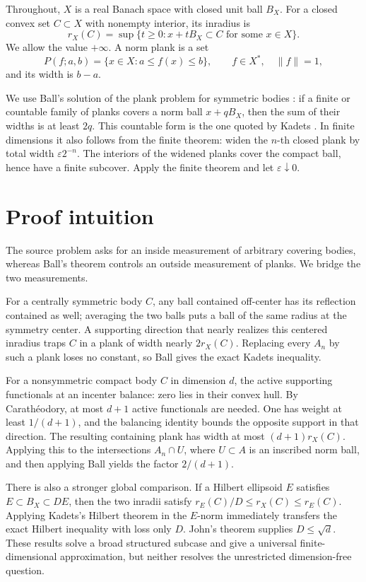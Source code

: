 \documentclass[11pt]{article}
\theoremstyle{remark}
\newcommand{\Ball}{B_X}
\newcommand{\rin}{r_X}
\begin{document}
Throughout, \(X\) is a real Banach space with closed unit ball \(\Ball\). For
a closed convex set \(C\subset X\) with nonempty interior, its inradius is
\[
  \rin(C)=\sup\{t\ge0: x+t\Ball\subset C\text{ for some }x\in X\}.
\]
We allow the value \(+\infty\). A norm plank is a set
\[
  P(f;a,b)=\{x\in X:a\le f(x)\le b\},
  \qquad f\in X^*,\quad \|f\|=1,
\]
and its width is \(b-a\).

We use Ball's solution of the plank problem for symmetric bodies
\cite{Ball}: if a finite or countable family of planks covers a norm ball
\(x+q\Ball\), then the sum of their widths is at least \(2q\). This countable
form is the one quoted by Kadets \cite[p.~1]{Kadets}. In finite dimensions it
also follows from the finite theorem: widen the \(n\)-th closed plank by total
width \(\varepsilon 2^{-n}\). The interiors of the widened planks cover the
compact ball, hence have a finite subcover. Apply the finite theorem and let
\(\varepsilon\downarrow0\).

\section{Proof intuition}

The source problem asks for an inside measurement of arbitrary covering
bodies, whereas Ball's theorem controls an outside measurement of planks. We
bridge the two measurements.

For a centrally symmetric body \(C\), any ball contained off-center has its
reflection contained as well; averaging the two balls puts a ball of the same
radius at the symmetry center. A supporting direction that nearly realizes
this centered inradius traps \(C\) in a plank of width nearly \(2r_X(C)\).
Replacing every \(A_n\) by such a plank loses no constant, so Ball gives the
exact Kadets inequality.

For a nonsymmetric compact body \(C\) in dimension \(d\), the active supporting
functionals at an incenter balance: zero lies in their convex hull. By
Carath\'eodory, at most \(d+1\) active functionals are needed. One has weight
at least \(1/(d+1)\), and the balancing identity bounds the opposite support
in that direction. The resulting containing plank has width at most
\((d+1)r_X(C)\). Applying this to the intersections \(A_n\cap U\), where
\(U\subset A\) is an inscribed norm ball, and then applying Ball yields the
factor \(2/(d+1)\).

There is also a stronger global comparison. If a Hilbert ellipsoid \(E\)
satisfies \(E\subset B_X\subset D E\), then the two inradii satisfy
\(r_E(C)/D\le r_X(C)\le r_E(C)\). Applying Kadets's Hilbert theorem in the
\(E\)-norm immediately transfers the exact Hilbert inequality with loss
only \(D\). John's theorem supplies \(D\le\sqrt d\). These results solve a
broad structured subcase and give a universal finite-dimensional
approximation, but neither resolves the unrestricted dimension-free question.
\end{document}
